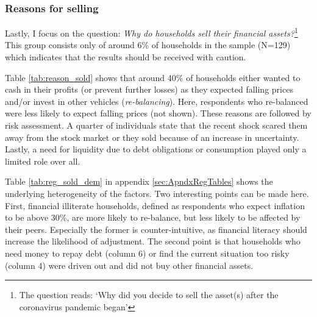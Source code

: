 \documentclass[ProjectABM]{subfiles}
\begin{document}
\subsubsection{Reasons for selling}
Lastly, I focus on the question: \textit{Why do households sell their financial assets?}\footnote{The question reads: `Why did you decide to sell the asset(s) after the coronavirus pandemic began'} This group consists only of around 6\% of households in the sample (N=129) which indicates that the results should be received with caution.



Table \ref{tab:reason_sold} shows that around 40\% of households either wanted to cash in their profits (or prevent further losses) as they expected falling prices and/or invest in other vehicles (\textit{re-balancing}). Here, respondents who re-balanced were less likely to expect falling prices (not shown). These reasons are followed by risk assessment. A quarter of individuals state that the recent shock scared them away from the stock market or they sold because of an increase in uncertainty. Lastly, a need for liquidity due to debt obligations or consumption played only a limited role over all. %

Table \ref{tab:reg_sold_dem} in appendix \ref{sec:ApndxRegTables} shows the underlying heterogeneity of the factors. Two interesting points can be made here. First, financial illiterate households, defined as respondents who expect inflation to be above 30\%, are more likely to re-balance, but less likely to be affected by their peers. Especially the former is counter-intuitive, as financial literacy should increase the likelihood of adjustment. The second point is that households who need money to repay debt (column 6) or find the current situation too risky (column 4) were driven out and did not buy other financial assets. %
\end{document}
